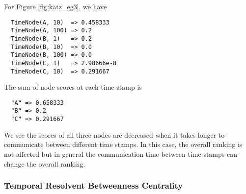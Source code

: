 \documentclass[12pt]{article}
\theoremstyle{definition}
\begin{document}
For Figure \ref{fig:katz_eg3}, we have
\begin{lstlisting}
  TimeNode(A, 10)  => 0.458333
  TimeNode(A, 100) => 0.2
  TimeNode(B, 1)   => 0.2
  TimeNode(B, 10)  => 0.0
  TimeNode(B, 100) => 0.0
  TimeNode(C, 1)   => 2.98666e-8
  TimeNode(C, 10)  => 0.291667
\end{lstlisting}
The sum of node scores at each time stamp is
\begin{lstlisting}
  "A" => 0.658333
  "B" => 0.2
  "C" => 0.291667
\end{lstlisting}
We see the scores of all three nodes are decreased when it takes longer to communicate between different time stamps. In this case, the overall ranking is not affected but in general the communication time between time stamps can change the overall ranking.

\subsubsection{Temporal Resolvent Betweenness Centrality}
\end{document}
